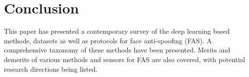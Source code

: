 \documentclass[10pt,journal,compsoc]{IEEEtran}
\begin{document}








\vspace{-0.5em}
\section{Conclusion} \label{sec:conclusion}
This paper has presented a contemporary survey of the deep learning based methods, datasets as well as protocols for face anti-spoofing (FAS). A comprehensive taxonomy of these methods have been presented. Merits and demerits of various methods and sensors for FAS are also covered, with potential research directions being listed.
\end{document}
